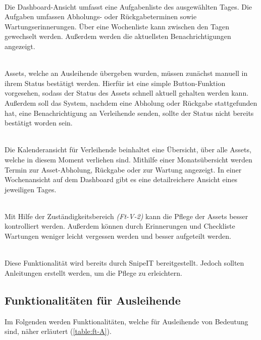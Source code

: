{\sffamily\color{maincolor}{Ft-V-1 | Dashboard }}\\
Die Dashboard-Ansicht umfasst eine Aufgabenliste des ausgewählten Tages. Die Aufgaben umfassen
Abholungs- oder Rückgabeterminen sowie Wartungserinnerungen. Über eine Wochenliste kann zwischen
den Tagen gewechselt werden. Außerdem werden die aktuellsten Benachrichtigungen angezeigt.

    {\sffamily\color{maincolor}{Ft-V-2 | Bearbeiten des Assetstatus }}\\
Assets, welche an Ausleihende übergeben wurden, müssen zunächst manuell in ihrem Status bestätigt
werden. Hierfür ist eine simple Button-Funktion vorgesehen, sodass der Status des Assets schnell aktuell
gehalten werden kann. Außerdem soll das System, nachdem eine Abholung oder Rückgabe stattgefunden
hat, eine Benachrichtigung an Verleihende senden, sollte der Status nicht bereits bestätigt worden
sein.

    {\sffamily\color{maincolor}{Ft-B-4 | Kalenderansicht für Verleihende}}\\
Die Kalenderansicht für Verleihende beinhaltet eine Übersicht, über alle Assets, welche in diesem Moment
verliehen sind. Mithilfe einer Monatsübersicht werden Termin zur Asset-Abholung, Rückgabe oder zur
Wartung angezeigt. In einer Wochenansicht auf dem Dashboard gibt es eine detailreichere Ansicht
eines jeweiligen Tages.


    {\sffamily\color{maincolor}{Ft-V-3 | Pflege von Assets   }}\\
Mit Hilfe der Zuständigkeitsbereich \textit{(Ft-V-2)} kann die Pflege der Assets besser kontrolliert
werden. Außerdem können durch Erinnerungen und Checkliste Wartungen weniger leicht vergessen werden
und besser aufgeteilt werden.


    {\sffamily\color{maincolor}{Ft-V-4 | Pflege der Datenbank }}\\
Diese Funktionalität wird bereits durch SnipeIT bereitgestellt. Jedoch sollten Anleitungen
erstellt werden, um die Pflege zu erleichtern. 

\subsection{Funktionalitäten für Ausleihende}
Im Folgenden werden Funktionalitäten, welche für Ausleihende von Bedeutung sind, näher erläutert
(\ref{table:ft-A}).

